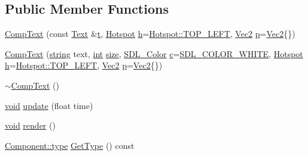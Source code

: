 \subsection*{Public Member Functions}
\begin{DoxyCompactItemize}
\item 
\hyperlink{class_comp_text_a4dda0bbb1f7059570a23eb91c9871465}{Comp\-Text} (const \hyperlink{class_text}{Text} \&\hyperlink{_s_d_l__opengl_8h_a7d65d00ca3b0630d9b5c52df855b19f5}{t}, \hyperlink{common_8hpp_aaa588ba8f99807e02a59c99df80af509}{Hotspot} \hyperlink{_s_d_l__opengl__glext_8h_afa0fb1b5e976920c0abeff2dca3ed774}{h}=\hyperlink{common_8hpp_aaa588ba8f99807e02a59c99df80af509a6b4ed010af97f067c8ba669e400f3f93}{Hotspot\-::\-T\-O\-P\-\_\-\-L\-E\-F\-T}, \hyperlink{class_vec2}{Vec2} \hyperlink{_s_d_l__opengl__glext_8h_aa5367c14d90f462230c2611b81b41d23}{p}=\hyperlink{class_vec2}{Vec2}\{\})
\item 
\hyperlink{class_comp_text_abdcc687e4cfc9b07859bbba77f7d833d}{Comp\-Text} (\hyperlink{_s_d_l__opengl__glext_8h_ae84541b4f3d8e1ea24ec0f466a8c568b}{string} text, \hyperlink{_s_d_l__thread_8h_a6a64f9be4433e4de6e2f2f548cf3c08e}{int} \hyperlink{_s_d_l__opengl__glext_8h_a3d1e3edfcf61ca2d831883e1afbad89e}{size}, \hyperlink{struct_s_d_l___color}{S\-D\-L\-\_\-\-Color} \hyperlink{_s_d_l__opengl__glext_8h_a1f2d7f8147412c43ba2303a56f97ee73}{c}=\hyperlink{common_8hpp_a8747c93cef1c9985be8fc426565f466e}{S\-D\-L\-\_\-\-C\-O\-L\-O\-R\-\_\-\-W\-H\-I\-T\-E}, \hyperlink{common_8hpp_aaa588ba8f99807e02a59c99df80af509}{Hotspot} \hyperlink{_s_d_l__opengl__glext_8h_afa0fb1b5e976920c0abeff2dca3ed774}{h}=\hyperlink{common_8hpp_aaa588ba8f99807e02a59c99df80af509a6b4ed010af97f067c8ba669e400f3f93}{Hotspot\-::\-T\-O\-P\-\_\-\-L\-E\-F\-T}, \hyperlink{class_vec2}{Vec2} \hyperlink{_s_d_l__opengl__glext_8h_aa5367c14d90f462230c2611b81b41d23}{p}=\hyperlink{class_vec2}{Vec2}\{\})
\item 
\hyperlink{class_comp_text_a12a92d6e53cf8640770604f8991eb1ca}{$\sim$\-Comp\-Text} ()
\item 
\hyperlink{_s_d_l__opengles2__gl2ext_8h_ae5d8fa23ad07c48bb609509eae494c95}{void} \hyperlink{class_comp_text_a7c77ec33b3fe74de7bb54906eac33faa}{update} (float time)
\item 
\hyperlink{_s_d_l__opengles2__gl2ext_8h_ae5d8fa23ad07c48bb609509eae494c95}{void} \hyperlink{class_comp_text_ac546961e42fa2b51e63aa55e7415936d}{render} ()
\item 
\hyperlink{class_component_ad6d161b6acf7b843b55bb9feac7af71a}{Component\-::type} \hyperlink{class_comp_text_a9ebc96605bb9c997ec65d5cda5075891}{Get\-Type} () const 
\end{DoxyCompactItemize}
